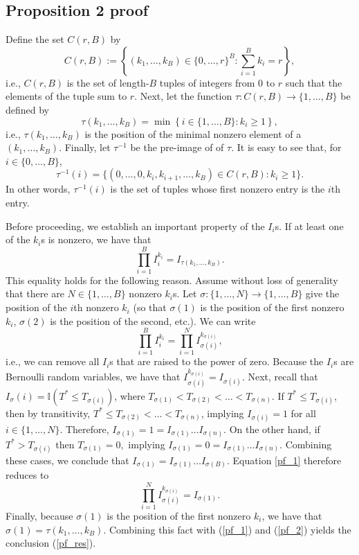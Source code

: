 \documentclass[12pt]{article}
\begin{document}
\begin{appendices}
\subsection*{Proposition 2 proof}
Define the set $C(r,B)$ by
$$C(r,B) := \left\{ (k_1, \dots, k_B) \in \{0, \dots, r\}^B : \sum_{i=1}^B k_i = r \right\},$$ i.e., $C(r,B)$ is the set of length-$B$ tuples of integers from $0$ to $r$ such that the elements of the tuple sum to $r$. Next, let the function $\tau: C(r,B) \to \{ 1, \dots, B \}$ be defined by
$$ \tau(k_1, \dots, k_B) = \min\left\{ i \in \{ 1, \dots, B \} : k_i \geq 1 \right\},$$
i.e., $\tau(k_1, \dots, k_B)$ is the position of the minimal nonzero element of a $(k_1, \dots, k_B)$. Finally, let $\tau^{-1}$ be the pre-image of of $\tau$. It is easy to see that, for $i \in \{0, \dots, B\}$,
$$\tau^{-1}(i) = \{ (0, \dots, 0, k_i, k_{i+1}, \dots, k_B) \in C(r,B) : k_i \geq 1 \}.$$ In other words, $\tau^{-1}(i)$ is the set of tuples whose first nonzero entry is the $i$th entry. 

Before proceeding, we establish an important property of the $I_i$s. If at least one of the $k_i$s is nonzero, we have that
\begin{equation}\label{pf_res}
 \prod_{i=1}^B I^{k_i}_i = I_{\tau(k_1, \dots, k_B)}.
 \end{equation}
This equality holds for the following reason. Assume without loss of generality that there are $N \in \{1, \dots, B\}$ nonzero $k_i$s. Let $\sigma: \{1, \dots, N\} \to \{1, \dots, B\}$ give the position of the $i$th nonzero $k_i$ (so that $\sigma(1)$ is the position of the first nonzero $k_i$, $\sigma(2)$ is the position of the second, etc.). We can write
\begin{equation}\label{pf_1}
\prod_{i=1}^B I_i^{k_i} = \prod_{i=1}^N I_{\sigma(i)}^{k_{\sigma(i)}},
\end{equation} 
i.e., we can remove all $I_i$s that are raised to the power of zero. Because the $I_i$s are Bernoulli random variables, we have that $I_{\sigma(i)}^{ k_{\sigma(i)}} = I_{\sigma(i)}$. Next, recall that $I_\sigma(i) = \mathbb{I}\left( T^* \leq T_{\sigma(i)} \right)$, where $T_{\sigma(1)} < T_{\sigma(2)} < \dots < T_{\sigma(n)}.$ If $T^* \leq T_{\sigma(i)}$, then by transitivity, $T^* \leq T_{\sigma(2)} < \dots < T_{\sigma(n)}$, implying $I_{\sigma(i)} = 1$ for all $i \in \{1, \dots, N\}.$ Therefore, $I_{\sigma(1)} = 1 = I_{\sigma(1)} \dots I_{\sigma(n)}.$ On the other hand, if $T^* > T_{\sigma(i)}$ then $T_{\sigma(1)} = 0,$ implying $I_{\sigma(1)} = 0 = I_{\sigma(1)} \dots I_{\sigma(n)}$. Combining these cases, we conclude that $I_{\sigma(1)} = I_{\sigma(1)} \dots I_{\sigma(B)}$. Equation \ref{pf_1} therefore reduces to
\begin{equation}\label{pf_2}
\prod_{i=1}^N I_{\sigma(i)}^{k_{\sigma(i)}} = I_{\sigma(1)}.
\end{equation}
 Finally, because $\sigma(1)$ is the position of the first nonzero $k_i$, we have that $\sigma(1) = \tau(k_1, \dots, k_B).$ Combining this fact with (\ref{pf_1}) and (\ref{pf_2}) yields the conclusion (\ref{pf_res}).


\end{appendices}
\end{document}
